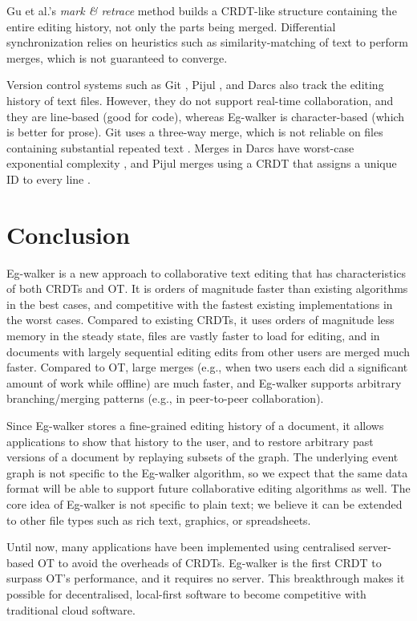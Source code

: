 \documentclass[sigplan,10pt]{acmart}
\newcommand{\algname}{Eg-walker\xspace}
\begin{document}
Gu et al.'s \emph{mark \& retrace} method \cite{Gu2005} builds a CRDT-like structure containing the entire editing history, not only the parts being merged.
Differential synchronization \cite{Fraser2009} relies on heuristics such as similarity-matching of text to perform merges, which is not guaranteed to converge.

Version control systems such as Git \cite{Coglan2019}, Pijul \cite{pijul}, and Darcs \cite{darcs} also track the editing history of text files.
However, they do not support real-time collaboration, and they are line-based (good for code), whereas \algname is character-based (which is better for prose).
Git uses a three-way merge, which is not reliable on files containing substantial repeated text \cite{Khanna2007}.
Merges in Darcs have worst-case exponential complexity \cite{darcs-book}, and Pijul merges using a CRDT that assigns a unique ID to every line \cite{pijul-theory}.

\section{Conclusion}

\algname is a new approach to collaborative text editing that has characteristics of both CRDTs and OT.
It is orders of magnitude faster than existing algorithms in the best cases, and competitive with the fastest existing implementations in the worst cases.
Compared to existing CRDTs, it uses orders of magnitude less memory in the steady state, files are vastly faster to load for editing, and in documents with largely sequential editing edits from other users are merged much faster.
Compared to OT, large merges (e.g., when two users each did a significant amount of work while offline) are much faster, and \algname supports arbitrary branching/merging patterns (e.g., in peer-to-peer collaboration).

Since \algname stores a fine-grained editing history of a document, it allows applications to show that history to the user, and to restore arbitrary past versions of a document by replaying subsets of the graph.
The underlying event graph is not specific to the \algname algorithm, so we expect that the same data format will be able to support future collaborative editing algorithms as well.
The core idea of \algname is not specific to plain text; we believe it can be extended to other file types such as rich text, graphics, or spreadsheets.

Until now, many applications have been implemented using centralised server-based OT to avoid the overheads of CRDTs.
\algname is the first CRDT to surpass OT's performance, and it requires no server.
This breakthrough makes it possible for decentralised, local-first software \cite{Kleppmann2019localfirst} to become competitive with traditional cloud software.
\end{document}

